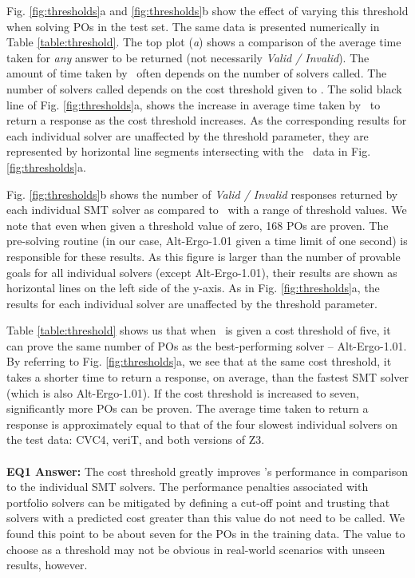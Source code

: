 Fig. \ref{fig:thresholds}a and \ref{fig:thresholds}b show the effect of varying this threshold when solving POs in the test set.
The same data is presented numerically in Table \ref{table:threshold}. 
The top plot (\textit{a}) shows a comparison of the average time taken for \textit{any} answer to be returned (not necessarily \textit{Valid / Invalid}).
The amount of time taken by \where~often depends on the number of solvers called.
The number of solvers called depends on the cost threshold given to \where. 
The solid black line of Fig. \ref{fig:thresholds}a, shows the increase in average time taken by \where~to return a response as the cost threshold increases.
As the corresponding results for each individual solver are unaffected by the threshold parameter, they are represented by horizontal line segments intersecting with the \where~data in Fig. \ref{fig:thresholds}a.

Fig. \ref{fig:thresholds}b shows the number of \textit{Valid / Invalid} responses returned by each individual SMT solver as compared to \where~with a range of threshold values.
We note that even when given a threshold value of zero, 168 POs are proven.
The pre-solving routine (in our case, Alt-Ergo-1.01 given a time limit of one second) is responsible for these results.
As this figure is larger than the number of provable goals for all individual solvers (except Alt-Ergo-1.01), their results are shown as horizontal lines on the left side of the y-axis.
As in Fig. \ref{fig:thresholds}a, the results for each individual solver are unaffected by the threshold parameter.

Table \ref{table:threshold} shows us that when \where~is given a cost threshold of five, it can prove the same number of POs as the best-performing solver -- Alt-Ergo-1.01. 
By referring to Fig. \ref{fig:thresholds}a, we see that at the same cost threshold, it takes a shorter time to return a response, on average, than the fastest SMT solver (which is also Alt-Ergo-1.01).
If the cost threshold is increased to seven, significantly more POs can be proven. 
The average time taken to return a response is approximately equal to that of the four slowest individual solvers on the test data: CVC4, veriT, and both versions of Z3. \\
\\
\textbf{EQ1 Answer:} The cost threshold greatly improves \where's performance in comparison to the individual SMT solvers.
The performance penalties associated with portfolio solvers can be mitigated by defining a cut-off point and trusting that solvers with a predicted cost greater than this value do not need to be called.
We found this point to be about seven for the POs in the training data.
The value to choose as a threshold may not be obvious in real-world scenarios with unseen results, however. 






